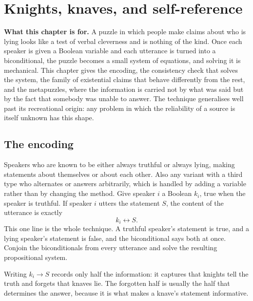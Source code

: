 \chapter{Knights, knaves, and self-reference}

\begin{orient}
\textbf{What this chapter is for.} A puzzle in which people make claims about who is lying looks like a test of verbal cleverness and is nothing of the kind. Once each speaker is given a Boolean variable and each utterance is turned into a biconditional, the puzzle becomes a small system of equations, and solving it is mechanical. This chapter gives the encoding, the consistency check that solves the system, the family of existential claims that behave differently from the rest, and the metapuzzles, where the information is carried not by what was said but by the fact that somebody was unable to answer. The technique generalises well past its recreational origin: any problem in which the reliability of a source is itself unknown has this shape.
\end{orient}

\section{The encoding}

\cue Speakers who are known to be either always truthful or always lying, making statements about themselves or about each other. Also any variant with a third type who alternates or answers arbitrarily, which is handled by adding a variable rather than by changing the method.
\method Give speaker $i$ a Boolean $k_{i}$, true when the speaker is truthful. If speaker $i$ utters the statement $S$, the content of the utterance is exactly
\[
k_{i}\leftrightarrow S.
\]
This one line is the whole technique. A truthful speaker's statement is true, and a lying speaker's statement is false, and the biconditional says both at once. Conjoin the biconditionals from every utterance and solve the resulting propositional system.

\begin{keynote}
Writing $k_{i}\to S$ records only half the information: it captures that knights tell the truth and forgets that knaves lie. The forgotten half is usually the half that determines the answer, because it is what makes a knave's statement informative.
\end{keynote}

